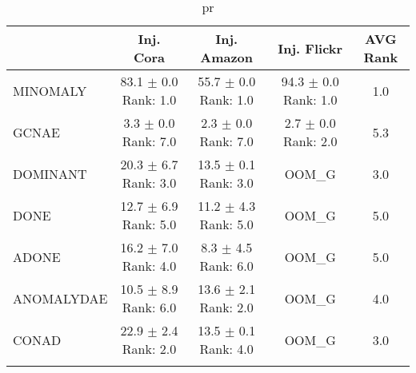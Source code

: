 \begin{longtable}{|l|c|c|c|c|}
\hline
 & Inj. Cora & Inj. Amazon & Inj. Flickr & AVG Rank \\ \hline
MINOMALY & \makecell{ 83.1 $\pm$ 0.0 \\ \tiny Rank: 1.0 } & \makecell{ 55.7 $\pm$ 0.0 \\ \tiny Rank: 1.0 } & \makecell{ 94.3 $\pm$ 0.0 \\ \tiny Rank: 1.0 } & 1.0 \\ \hline 
GCNAE & \makecell{ 3.3 $\pm$ 0.0 \\ \tiny Rank: 7.0 } & \makecell{ 2.3 $\pm$ 0.0 \\ \tiny Rank: 7.0 } & \makecell{ 2.7 $\pm$ 0.0 \\ \tiny Rank: 2.0 } & 5.3 \\ \hline 
DOMINANT & \makecell{ 20.3 $\pm$ 6.7 \\ \tiny Rank: 3.0 } & \makecell{ 13.5 $\pm$ 0.1 \\ \tiny Rank: 3.0 } & OOM\_G & 3.0 \\ \hline 
DONE & \makecell{ 12.7 $\pm$ 6.9 \\ \tiny Rank: 5.0 } & \makecell{ 11.2 $\pm$ 4.3 \\ \tiny Rank: 5.0 } & OOM\_G & 5.0 \\ \hline 
ADONE & \makecell{ 16.2 $\pm$ 7.0 \\ \tiny Rank: 4.0 } & \makecell{ 8.3 $\pm$ 4.5 \\ \tiny Rank: 6.0 } & OOM\_G & 5.0 \\ \hline 
ANOMALYDAE & \makecell{ 10.5 $\pm$ 8.9 \\ \tiny Rank: 6.0 } & \makecell{ 13.6 $\pm$ 2.1 \\ \tiny Rank: 2.0 } & OOM\_G & 4.0 \\ \hline 
CONAD & \makecell{ 22.9 $\pm$ 2.4 \\ \tiny Rank: 2.0 } & \makecell{ 13.5 $\pm$ 0.1 \\ \tiny Rank: 4.0 } & OOM\_G & 3.0 \\ \hline 
\caption{ pr } \label{tab:pr}
\end{longtable}
